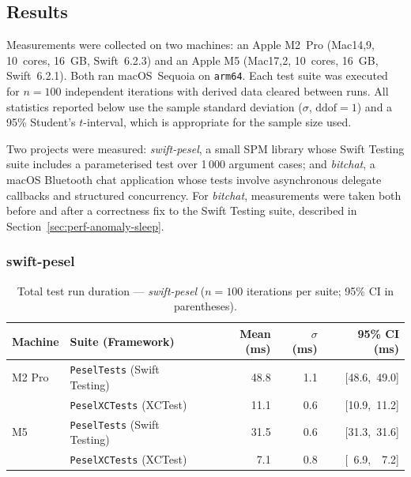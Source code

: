 \subsection{Results}
\label{sec:perf-results}

Measurements were collected on two machines: an Apple M2~Pro
(Mac14,9, 10~cores, 16~GB, Swift~6.2.3) and an Apple M5
(Mac17,2, 10~cores, 16~GB, Swift~6.2.1). Both ran macOS~Sequoia on
\texttt{arm64}. Each test suite was executed for $n = 100$ independent iterations
with derived data cleared between runs. All statistics reported below use the sample
standard deviation ($\sigma$, $\text{ddof}=1$) and a 95\% Student's
$t$-interval, which is appropriate for the sample size used.

Two projects were measured: \textit{swift-pesel}, a small SPM library whose Swift
Testing suite includes a parameterised test over 1\,000 argument cases; and
\textit{bitchat}, a macOS Bluetooth chat application whose tests involve asynchronous
delegate callbacks and structured concurrency. For \textit{bitchat}, measurements
were taken both before and after a correctness fix to the Swift Testing suite,
described in Section~\ref{sec:perf-anomaly-sleep}.

\subsubsection*{swift-pesel}

\begin{table}[ht]
    \centering
    \caption{%
        Total test run duration --- \textit{swift-pesel}
        ($n = 100$ iterations per suite; 95\% CI in parentheses).%
    }
    \label{tab:perf-pesel}
    \begin{tabular}{llrrr}
        \toprule
        \textbf{Machine} & \textbf{Suite (Framework)} &
        \textbf{Mean (ms)} & \textbf{$\sigma$ (ms)} & \textbf{95\% CI (ms)} \\
        \midrule
        M2 Pro & \texttt{PeselTests} (Swift Testing)  & 48.8 & 1.1 & [48.6,\ 49.0] \\
               & \texttt{PeselXCTests} (XCTest)        & 11.1 & 0.6 & [10.9,\ 11.2] \\
        \midrule
        M5     & \texttt{PeselTests} (Swift Testing)  & 31.5 & 0.6 & [31.3,\ 31.6] \\
               & \texttt{PeselXCTests} (XCTest)        &  7.1 & 0.8 & [\ 6.9,\ \ 7.2] \\
        \bottomrule
    \end{tabular}
\end{table}

